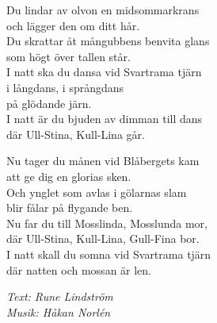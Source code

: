 \vspace{10pt}
Du lindar av olvon en midsommarkrans\\
och lägger den om ditt hår.\\
Du skrattar åt mångubbens benvita glans\\
som högt över tallen står.\\
I natt ska du dansa vid Svartrama tjärn\\
i långdans, i språngdans\\
på glödande järn.\\
I natt är du bjuden av dimman till dans\\
där Ull-Stina, Kull-Lina går.\par
\vspace{10pt}
Nu tager du månen vid Blåbergets kam\\
att ge dig en glorias sken.\\
Och ynglet som avlas i gölarnas slam\\
blir fålar på flygande ben.\\
Nu far du till Mosslinda, Mosslunda mor,\\
där Ull-Stina, Kull-Lina, Gull-Fina bor.\\
I natt skall du somna vid Svartrama tjärn\\
där natten och mossan är len.
\par
\vspace{10pt}
{\footnotesize\textit{Text: Rune Lindström\\ Musik: Håkan Norlén}}
